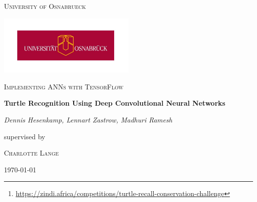 \documentclass[11pt]{article}
\begin{document}
\begin{titlepage}
	\centering
	{\scshape\LARGE University of Osnabrueck \par}
	\vspace{1cm}
	\includegraphics[width=0.5\textwidth]{images/uniOsnabruck.jpg}\par\vspace{2cm}
	\vspace{0.75cm}
	{\scshape\Large Implementing ANNs with TensorFlow\par}
	\vspace{1.5cm}
	{\huge\bfseries Turtle Recognition Using Deep Convolutional Neural Networks\par}
	\vspace{1.5cm}
	{\Large\itshape Dennis Hesenkamp, Lennart Zastrow,  Madhuri Ramesh\par}
	\vspace{1.5cm}
	supervised by\par
	\textsc{Charlotte Lange}
	\vfill

	{\large \today\par}
\end{titlepage}

\tableofcontents
\newpage

\begin{abstract}
    Sea turtles are a very important, but endangered, species for the ecosystems they live in, so being able to track and identify them is critical for modern conservation. Their unique head patterns allow for identification from photographs with the help of neural networks. As part of a machine learning competition on the platform Zindi \footnote{\url{https://zindi.africa/competitions/turtle-recall-conservation-challenge}}, we built a convolutional neural network in order to identify sea turtles and investigate how different, commonly used image augmentation techniques influence the model’s ability to learn about the features of given turtle images.  The accompanying code can be found in  repository: \url{https://github.com/dhesenkamp/turtleRecall}
\end{abstract}













\newpage

\end{document}

